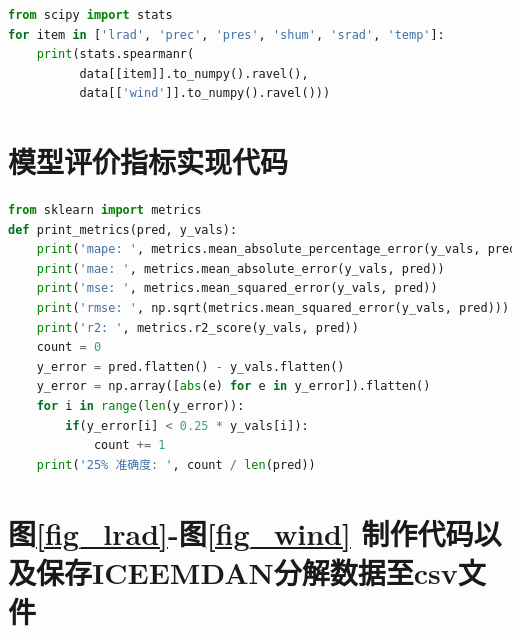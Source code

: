 \documentclass[AutoFakeBold]{LZUThesis}
\begin{document}
\begin{lstlisting}[language = python]
from scipy import stats
for item in ['lrad', 'prec', 'pres', 'shum', 'srad', 'temp']:
    print(stats.spearmanr(
          data[[item]].to_numpy().ravel(),
          data[['wind']].to_numpy().ravel()))
\end{lstlisting}

\section{模型评价指标实现代码}

\begin{lstlisting}[language = python]
from sklearn import metrics
def print_metrics(pred, y_vals):
    print('mape: ', metrics.mean_absolute_percentage_error(y_vals, pred))
    print('mae: ', metrics.mean_absolute_error(y_vals, pred))
    print('mse: ', metrics.mean_squared_error(y_vals, pred))
    print('rmse: ', np.sqrt(metrics.mean_squared_error(y_vals, pred)))
    print('r2: ', metrics.r2_score(y_vals, pred))
    count = 0
    y_error = pred.flatten() - y_vals.flatten()
    y_error = np.array([abs(e) for e in y_error]).flatten()
    for i in range(len(y_error)):
        if(y_error[i] < 0.25 * y_vals[i]):
            count += 1
    print('25% 准确度: ', count / len(pred))
\end{lstlisting}

\section{图\ref{fig_lrad}-图\ref{fig_wind} 制作代码以及保存ICEEMDAN分解数据至csv文件}
\end{document}
